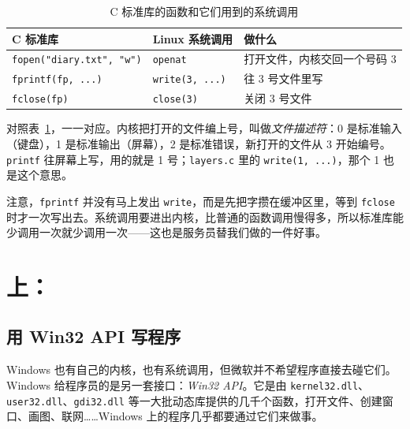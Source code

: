 \begin{table}[htbp]
  \begin{lazywide}
  \caption{C 标准库的函数和它们用到的系统调用}
  \label{tab:file-syscalls}
  \begin{tabular}{lll}
    \toprule
    C 标准库 & Linux 系统调用 & 做什么 \\
    \midrule
    \texttt{fopen("diary.txt", "w")} & \texttt{openat} & 打开文件，内核交回一个号码 3 \\
    \texttt{fprintf(fp, ...)}         & \texttt{write(3, ...)} & 往 3 号文件里写 \\
    \texttt{fclose(fp)}               & \texttt{close(3)} & 关闭 3 号文件 \\
    \bottomrule
  \end{tabular}
  \end{lazywide}
\end{table}

对照表~\ref{tab:file-syscalls}，一一对应。内核把打开的文件编上号，叫做\emph{文件描述符}：0 是标准输入（键盘），1 是标准输出（屏幕），2 是标准错误，新打开的文件从 3 开始编号。\texttt{printf} 往屏幕上写，用的就是 1 号；\texttt{layers.c} 里的 \texttt{write(1, ...)}，那个 1 也是这个意思。

注意，\texttt{fprintf} 并没有马上发出 \texttt{write}，而是先把字攒在缓冲区里，等到 \texttt{fclose} 时才一次写出去。系统调用要进出内核，比普通的函数调用慢得多，所以标准库能少调用一次就少调用一次——这也是服务员替我们做的一件好事。

\section{\texorpdfstring{}{Windows} 上：\texorpdfstring{}{Win32 API}}
\label{sec:win32}

\subsection{用 Win32 API 写程序}

Windows 也有自己的内核，也有系统调用，但微软并不希望程序直接去碰它们。Windows 给程序员的是另一套接口：\emph{Win32 API}。它是由 \texttt{kernel32.dll}、\texttt{user32.dll}、\texttt{gdi32.dll} 等一大批动态库提供的几千个函数，打开文件、创建窗口、画图、联网……Windows 上的程序几乎都要通过它们来做事。

